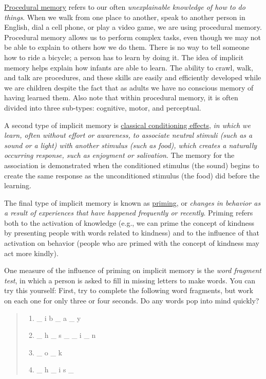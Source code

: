 \documentclass[
]{krantz}
\providecommand{\tightlist}{%
  \setlength{\itemsep}{0pt}\setlength{\parskip}{0pt}}
\begin{document}
\protect\hyperlink{procedural-memory}{Procedural memory} refers to our often \emph{unexplainable knowledge of how to do things}. When we walk from one place to another, speak to another person in English, dial a cell phone, or play a video game, we are using procedural memory. Procedural memory allows us to perform complex tasks, even though we may not be able to explain to others how we do them. There is no way to tell someone how to ride a bicycle; a person has to learn by doing it. The idea of implicit memory helps explain how infants are able to learn. The ability to crawl, walk, and talk are procedures, and these skills are easily and efficiently developed while we are children despite the fact that as adults we have no conscious memory of having learned them. Also note that within procedural memory, it is often divided into three sub-types: cognitive, motor, and perceptual.

A second type of implicit memory is \protect\hyperlink{classical-conditioning-effects}{classical conditioning effects}, \emph{in which we learn, often without effort or awareness, to associate neutral stimuli (such as a sound or a light) with another stimulus (such as food), which creates a naturally occurring response, such as enjoyment or salivation}. The memory for the association is demonstrated when the conditioned stimulus (the sound) begins to create the same response as the unconditioned stimulus (the food) did before the learning.

The final type of implicit memory is known as \protect\hyperlink{priming}{priming}, or \emph{changes in behavior as a result of experiences that have happened frequently or recently}. Priming refers both to the activation of knowledge (e.g., we can prime the concept of kindness by presenting people with words related to kindness) and to the influence of that activation on behavior (people who are primed with the concept of kindness may act more kindly).

One measure of the influence of priming on implicit memory is the \emph{word fragment test}, in which a person is asked to fill in missing letters to make words. You can try this yourself: First, try to complete the following word fragments, but work on each one for only three or four seconds. Do any words pop into mind quickly?

\begin{quote}
\begin{enumerate}
\def\labelenumi{\arabic{enumi}.}
\tightlist
\item
  \_ i b \_ a \_ y
\item
  \_ h \_ s \_ \_ i \_ n
\item
  \_ o \_ k
\item
  \_ h \_ i s \_
\end{enumerate}
\end{quote}
\end{document}
